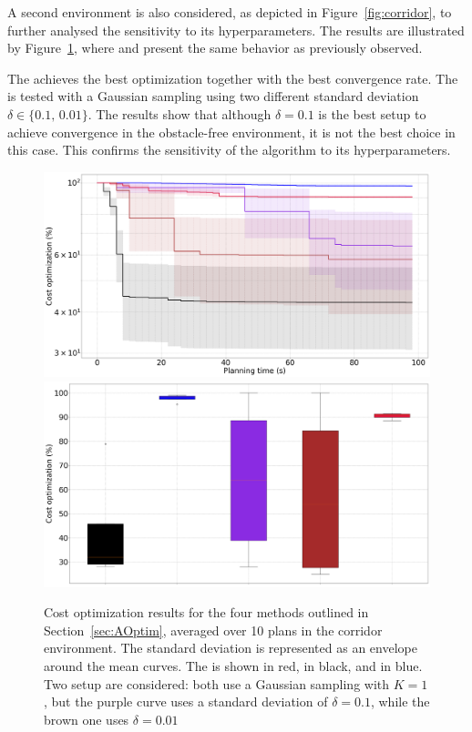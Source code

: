A second environment is also considered, as depicted in Figure~\ref{fig:corridor}, to further analysed the  sensitivity to its hyperparameters.
The results are illustrated by Figure~\ref{fig:acc_corridor}, where  and  present the same behavior as previously observed.

The  achieves the best optimization together with the best convergence rate.
The  is tested with a Gaussian sampling using two different standard deviation $\delta \in \{0.1, \, 0.01\}$.
The results show that although $\delta = 0.1$ is the best setup to achieve convergence in the obstacle-free environment, it is not the best choice in this case.
This confirms the sensitivity of the algorithm to its hyperparameters.

\begin{figure} [htp]
    \centering
    \includegraphics[width=0.9\linewidth]{figures/accuracy/all_methods_corridor.png} \\
    \includegraphics[width=0.9\linewidth]{figures/accuracy/bplot_all_methods_corridor.png}
    \caption{Cost optimization results for the four methods outlined in Section~\ref{sec:AOptim}, averaged over 10 plans in the corridor environment. 
    The standard deviation is represented as an envelope around the mean curves.
    The  is shown in red,  in black, and  in blue.
    Two  setup are considered: both use a Gaussian sampling with $K = 1$, but the purple curve uses a standard deviation of $\delta = 0.1$, while the brown one uses $\delta = 0.01$}%
    \label{fig:acc_corridor}%
\end{figure}

